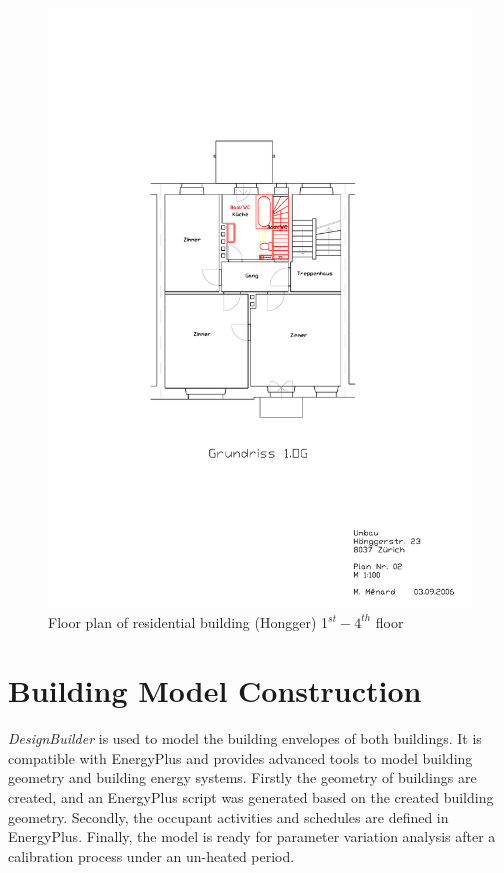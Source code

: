\documentclass[a4paper, oneside]{discothesis}
\begin{document}
		\begin{figure}[htbp]
		\centering
		\includegraphics[scale=1.2]{Hongg_1OG_Plan.pdf}
		\caption{Floor plan of residential building (Hongger) 1$^{st} - 4^{th}$ floor}
		\label{fig:hongg_og1_plan}
		\end{figure}


	\section{Building Model Construction}
		\textit{DesignBuilder} is used to model the building envelopes of both buildings. It is compatible with EnergyPlus and provides advanced tools to model building geometry and building energy systems. Firstly the geometry of buildings are created, and an EnergyPlus script was generated based on the created building geometry. Secondly, the occupant activities and schedules are defined in EnergyPlus. Finally, the model is ready for parameter variation analysis after a calibration process under an un-heated period.
\end{document}

